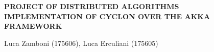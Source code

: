 \begin{center} {
	\bfseries\Large {PROJECT OF DISTRIBUTED ALGORITHMS } \\
	\vspace{0.1cm}
	\bfseries \large {IMPLEMENTATION OF CYCLON OVER THE AKKA FRAMEWORK} } \\
\end{center}
\begin{flushleft}
	Luca Zamboni (175606), Luca Erculiani (175605)
		
\end{flushleft}
